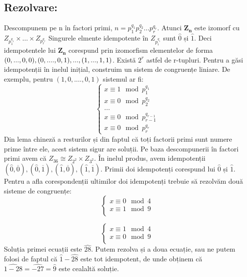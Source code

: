 \documentclass{article}
\begin{document}
\subsection {Rezolvare:}
Descompunem pe n în factori primi, $n=p_1^{q_1}p_2^{q_2} \dots p_r^{q_r}.$ Atunci $\mathbf{Z_n}$ este izomorf cu $Z_{p_1^{q_1}} \times \dots \times Z_{p_r^{q_r}}$
Singurele elmente idempotente în $Z_{p_i^{q_i}}$ sunt $\widehat{0}$ și $\widehat{1}$. Deci idempotentele lui $\mathbf{Z_n}$ corespund prin izomorfism elementelor de forma $(0, ..., 0, 0), (0, ...., 0, 1),\\ ..., (1, ..., 1, 1)$. Există $2^r$ astfel de r-tupluri.
Pentru a găsi idempotenții în inelul inițial, construim un sistem de congruențe liniare. De exemplu, pentru $(1, 0, ...., 0, 1)$ sistemul ar fi:
\newline
\[ \begin{cases} 
      x \equiv 1 \mod p_1^{q_1} \\
      x \equiv 0 \mod p_2^{q_2} \\
       ... \\
      x \equiv 0 \mod p_{r-1}^{q_{r-1}} \\
      x \equiv 0 \mod p_r^{q_r}
   \end{cases}
\]
Din lema chineză a resturilor și din faptul că toți factorii primi sunt numere prime între ele, acest sistem sigur are soluții.
\newline
Pe baza descompunerii în factori primi avem că $Z_{36} \cong Z_{2^2} \times Z_{3^2}$. În inelul produs, avem idempotenții $(\widehat{0},\overline{0}), (\widehat{0},\overline{1}), (\widehat{1},\overline{0}), (\widehat{1},\overline{1})$. Primii doi idempotenți corespund lui $\widehat{0}$ și $\widehat{1}$. Pentru a afla corespondenții ultimilor doi idempotenți trebuie să rezolvăm două sisteme de congruențe:
\newline
\[ \begin{cases} 
      x \equiv 0 \mod 4\\
      x \equiv 1 \mod 9 \\
   \end{cases}
\]

\[ \begin{cases} 
      x \equiv 1 \mod 4\\
      x \equiv 0 \mod 9 \\
   \end{cases}
\]
Soluția primei ecuații este $\widehat{28}$. Putem rezolva și a doua ecuație, sau ne putem folosi de faptul că $\widehat{1} - \widehat{28}$ este tot idempotent, de unde obținem că $\widehat{1 - 28} = \widehat{-27} = \widehat{9}$ este cealaltă soluție.
\end{document}
